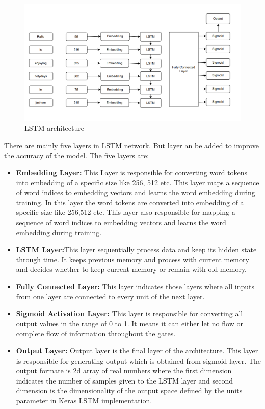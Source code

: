\begin{figure}[ht!]
  \includegraphics[width=\linewidth]{chapters/LSTM.png}
  \caption{LSTM architecture}
\end{figure}

There are mainly five layers in LSTM network. But layer an be added to improve the accuracy of the model. The five layers are:
\begin{itemize}
\item \textbf{Embedding Layer:} This Layer is responsible for converting word tokens into embedding of a specific size like 256, 512 etc. This layer maps a sequence of word indices to embedding vectors and learns the word embedding during training.
In this layer the word tokens are converted into embedding of a specific size like 256,512 etc. This layer also responsible for mapping a sequence of word indices to embedding vectors and learns the word embedding during training.

\item \textbf{LSTM Layer:}This layer sequentially process data and keep its hidden state through time. It keeps previous memory and process with current memory and decides whether to keep current memory or remain with old memory.
   
\item \textbf{Fully Connected Layer:} This layer indicates those layers where all inputs from one layer are connected to every unit of the next layer.

\item \textbf{Sigmoid Activation Layer:} This layer is responsible for converting all output values in the range of 0 to 1. It means it can either let no flow or complete flow of information throughout the gates.

\item \textbf{Output Layer:} Output layer is the final layer of the architecture. This layer is responsible for generating output which is obtained from sigmoid layer. The output formate is 2d array of real numbers where the first dimension indicates the number of samples given to the LSTM layer and second dimension is the dimensionality of the output space defined by the units
parameter in Keras LSTM implementation.
\end{itemize}
